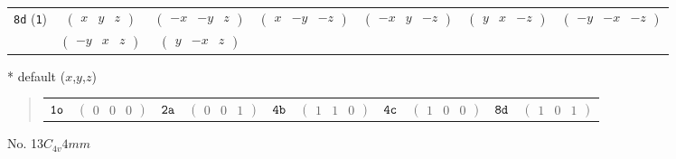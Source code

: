 \documentclass[fleqn,9pt,landscape]{jsarticle}
\begin{document}
\begin{center}
\begin{longtable}{ccccccc}
{\tt 8d} ({\tt 1}) & $ \begin{pmatrix} x & y & z \end{pmatrix} $ & $ \begin{pmatrix} - x & - y & z \end{pmatrix} $ & $ \begin{pmatrix} x & - y & - z \end{pmatrix} $ & $ \begin{pmatrix} - x & y & - z \end{pmatrix} $ & $ \begin{pmatrix} y & x & - z \end{pmatrix} $ & $ \begin{pmatrix} - y & - x & - z \end{pmatrix} $ \\
& $ \begin{pmatrix} - y & x & z \end{pmatrix} $ & $ \begin{pmatrix} y & - x & z \end{pmatrix} $ & $  $ & $  $ & $  $ & $  $ \\
\end{longtable}
\end{center}
* default ($x$,$y$,$z$)
\begin{quote}
\begin{tabular}{cccccccccc}
$ {\tt 1o} $ & $ \begin{pmatrix} 0 & 0 & 0 \end{pmatrix} $ & $ {\tt 2a} $ & $ \begin{pmatrix} 0 & 0 & 1 \end{pmatrix} $ & $ {\tt 4b} $ & $ \begin{pmatrix} 1 & 1 & 0 \end{pmatrix} $ & $ {\tt 4c} $ & $ \begin{pmatrix} 1 & 0 & 0 \end{pmatrix} $ & $ {\tt 8d} $ & $ \begin{pmatrix} 1 & 0 & 1 \end{pmatrix} $
\end{tabular}
\end{quote}
\newpage
No. 13\quad$C_{4v}$\quad$4mm$\quad[ tetragonal ]
\end{document}
